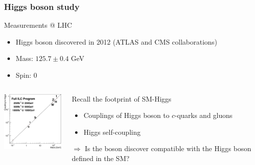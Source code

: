 \documentclass{beamer}
\begin{document}
    \begin{frame}
      \frametitle{Higgs boson study}

      \vspace{-0.3cm}
      \begin{block}{Measurements @ LHC}
        \begin{itemize}
          \item Higgs boson discovered in 2012 (ATLAS and CMS collaborations)
          \item Mass: $125.7 \pm 0.4$ GeV
          \item Spin: 0
        \end{itemize}
      \end{block}
          
      \vspace{-0.1cm}
      \begin{columns}[c] 

        \begin{column}{5cm}
          \centering
          \includegraphics[width = 4cm]{Pictures/Chapter_Theory_figs_mass-coupling1TeV.png}
        \end{column}
        \begin{column}{5cm}
          \centering
          \begin{alertblock}{Recall the footprint of SM-Higgs}
            \begin{itemize}
              \item Couplings of Higgs boson to $c$-quarks and gluons
              \item Higgs self-coupling 
            \end{itemize}
            \centering
            $\Rightarrow$ Is the boson discover compatible with the Higgs boson defined in the SM?
          \end{alertblock}
        \end{column}

      \end{columns}

    \end{frame}
\end{document}
